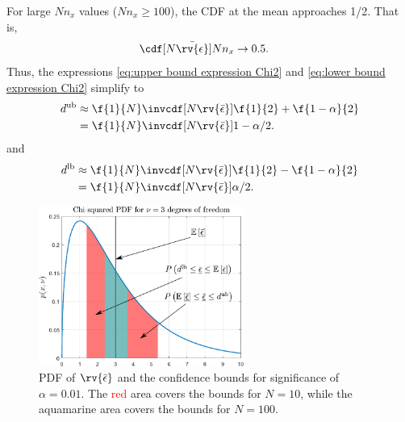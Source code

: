 \documentclass{simple-article}
\begin{document}
\begin{blackBox}
  For large $Nn_{x}$ values ($Nn_{x}\geq 100$), the CDF at the mean approaches 1/2. That is,
  \begin{align}
    \cdf[N\bar{\rv{\epsilon}}]{Nn_{x}}&\to 0.5.
  \end{align}
  Thus, the expressions \eqref{eq:upper bound expression Chi2} and \eqref{eq:lower bound expression Chi2} simplify to
  \begin{align}
    d^{\mathrm{ub}} 
            &\approx \f{1}{N}\invcdf[N\rv{\bar{\epsilon}}]{\f{1}{2} + \f{1-\alpha}{2}}\\
            &= \f{1}{N}\invcdf[N\rv{\bar{\epsilon}}]{1 - \alpha/2}.
  \end{align}
  and
  \begin{align}
    d^{\mathrm{lb}} 
            &\approx \f{1}{N}\invcdf[N\rv{\bar{\epsilon}}]{\f{1}{2} - \f{1-\alpha}{2}}\\
            &= \f{1}{N}\invcdf[N\rv{\bar{\epsilon}}]{\alpha/2}.
  \end{align}

  \begin{figure}[H]
    \centering
    \includegraphics[width=0.6\textwidth]{figs/chi2pdf_edited_2areas.pdf}    
    \caption{PDF of $\rv{\bar{\epsilon}}$ and the confidence bounds for significance of $\alpha=0.01$. The \textcolor{red}{red} area covers the bounds for {$N=10$}, while the \textcolor[RGB]{0,225,225}{aquamarine} area covers the bounds for {$N=100$}.}
    \label{fig:chi2pdf_edited_2areas}
  \end{figure}     
\end{blackBox}
\end{document}
